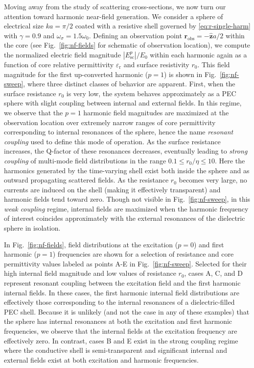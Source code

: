 \documentclass[article]{IEEEtran}
\newcommand{\T}[1]{\mathrm{#1}}
\newcommand{\V}[1]{\boldsymbol{#1}}
\begin{document}
Moving away from the study of scattering cross-sections, we now turn our attention toward harmonic near-field generation.  We consider a sphere of electrical size $ka=\pi/2$ coated with a resistive shell governed by \eqref{eq:r-single-harm} with $\gamma = 0.9$ and $\omega_\sigma = 1.5\omega_0$.  Defining an observation point $\V{r}_\T{obs} = -\V{\hat{z}}a/2$ within the core (see Fig.~\ref{fig:nf-fields} for schematic of observation location), we compute the normalized electric field magnitude $|E_\T{sc}^p|/E_0$ within each harmonic again as a function of core relative permittivity $\varepsilon_\T{r}$ and surface resistivity $r_0$.  This field magnitude for the first up-converted harmonic ($p=1$) is shown in Fig.~\ref{fig:nf-sweep}, where three distinct classes of behavior are apparent.  First, when the surface resistance $r_0$ is very low, the system behaves approximately as a PEC sphere with slight coupling between internal and external fields.  In this regime, we observe that the $p=1$ harmonic field magnitudes are maximized at the observation location over extremely narrow ranges of core permittivity corresponding to internal resonances of the sphere, hence the name \emph{resonant coupling} used to define this mode of operation.  As the surface resistance increases, the Q-factor of these resonances decreases, eventually leading to \emph{strong coupling} of multi-mode field distributions in the range $0.1\leq r_0/\eta \leq 10$.  Here the harmonics generated by the time-varying shell exist both inside the sphere and as outward propagating scattered fields.  As the resistance $r_0$ becomes very large, no currents are induced on the shell (making it effectively transparent) and harmonic fields tend toward zero.  Though not visible in Fig.~\ref{fig:nf-sweep}, in this \emph{weak coupling} regime, internal fields are maximized when the harmonic frequency of interest coincides approximately with the external resonances of the dielectric sphere in isolation.

In Fig.~\ref{fig:nf-fields}, field distributions at the excitation ($p=0$) and first harmonic ($p=1$) frequencies are shown for a selection of resistance and core permittivity values labeled as points A-E in Fig.~\ref{fig:nf-sweep}.  Selected for their high internal field magnitude and low values of resistance $r_0$, cases A, C, and D represent resonant coupling between the excitation field and the first harmonic internal fields.  In these cases, the first harmonic internal field distributions are effectively those corresponding to the internal resonances of a dielectric-filled PEC shell.  Because it is unlikely (and not the case in any of these examples) that the sphere has internal resonances at both the excitation and first harmonic frequencies, we observe that the internal fields at the excitation frequency are effectively zero.  In contrast, cases B and E exist in the strong coupling regime where the conductive shell is semi-transparent and significant internal and external fields exist at both excitation and harmonic frequencies.
\end{document}

